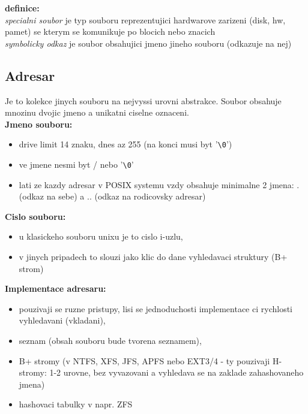 \documentclass[a4paper, 11pt]{article}
\begin{document}
\textbf{definice:} \\[0.5em]
\textit{specialni soubor} je typ souboru reprezentujici hardwarove zarizeni (disk, hw, pamet) se kterym se komunikuje po blocich nebo znacich \\[0.2em]
\textit{symbolicky odkaz} je soubor obsahujici jmeno jineho souboru (odkazuje na nej) \\

\newpage

\subsection{Adresar}
Je to kolekce jinych souboru na nejvyssi urovni abstrakce. Soubor obsahuje mnozinu dvojic jmeno a unikatni ciselne oznaceni. \\

\textbf{Jmeno souboru:}
\begin{itemize}
    \item drive limit 14 znaku, dnes az 255 (na konci musi byt '\verb|\0|')
    \item ve jmene nesmi byt / nebo '\verb|\0|' \\
    \item lati ze kazdy adresar v POSIX systemu vzdy obsahuje minimalne 2 jmena: . (odkaz na sebe) a .. (odkaz na rodicovsky adresar)
\end{itemize}

\textbf{Cislo souboru:}
\begin{itemize}
    \item u klasickeho souboru unixu je to cislo i-uzlu,
    \item v jinych pripadech to slouzi jako klic do dane vyhledavaci struktury (B+ strom) \\
\end{itemize}

\textbf{Implementace adresaru:}
\begin{itemize}
    \item pouzivaji se ruzne pristupy, lisi se jednoduchosti implementace ci rychlosti vyhledavani (vkladani),
    \item seznam (obsah souboru bude tvorena seznamem),
    \item B+ stromy (v NTFS, XFS, JFS, APFS nebo EXT3/4 - ty pouzivaji H-stromy: 1-2 urovne, bez vyvazovani a vyhledava se na zaklade zahashovaneho jmena)
    \item hashovaci tabulky v napr. ZFS \\
\end{itemize}
\end{document}
